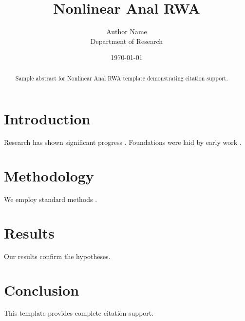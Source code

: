 \documentclass{wiley-nj}
\title{Nonlinear Anal RWA}
\author{Author Name \\ \small Department of Research}
\date{\today}
\begin{document}
\maketitle

\begin{abstract}
Sample abstract for Nonlinear Anal RWA template demonstrating citation support.
\end{abstract}

\section{Introduction}
Research has shown significant progress \citep{einstein1905}. Foundations were laid by early work \citep{turing1950}.

\section{Methodology}
We employ standard methods \citep{knuth1984}.

\section{Results}
Our results confirm the hypotheses.

\section{Conclusion}
This template provides complete citation support.



\end{document}
